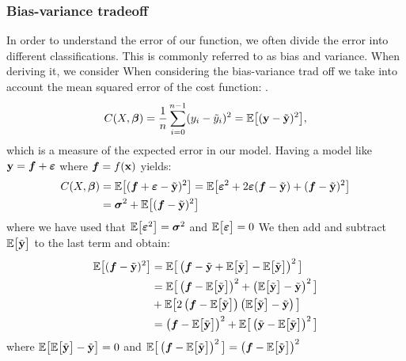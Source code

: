 \subsubsection{Bias-variance tradeoff}\label{sec:bias_variance_tradeoff}
In order to understand the error of our function, we often divide the error into different classifications. This is commonly referred to as bias and variance. When deriving it, we consider 
When considering the bias-variance trad off we take into account the mean squared error of the cost function: . 
\begin{align*}
    C(X, \boldsymbol{\beta}) = \frac{1}{n}\sum_{i=0}^{n-1}(y_i-\tilde{y}_i)^2 = \mathbb{E}\big[(\mathbf{y}-\tilde{\mathbf{y}})^2\big],
\end{align*}
which is a measure of the expected error in our model. Having a model like $\mathbf{y} = \boldsymbol{f} + \boldsymbol{\varepsilon}$ where $\boldsymbol{f} = f(\mathbf{x})$ yields:
\begin{align*}
    C(X, \boldsymbol{\beta})  &= \mathbb{E}\big[(\boldsymbol{f} + \boldsymbol{\varepsilon} - \tilde{\mathbf{y}})^2\big] = \mathbb{E}\big[\boldsymbol{\varepsilon}^2 + 2\boldsymbol{\varepsilon}(\boldsymbol{f}-\tilde{\mathbf{y}}) + (\boldsymbol{f}-\tilde{\mathbf{y}})^2\big] \\
    &= \boldsymbol{\sigma}^2 + \mathbb{E}\big[(\boldsymbol{f}-\tilde{\mathbf{y}})^2\big]
\end{align*}
where we have used that $\mathbb{E}\big[\boldsymbol{\varepsilon}^2\big] = \boldsymbol{\sigma}^2$ and $\mathbb{E}\big[\boldsymbol{\varepsilon}\big] = 0$ We then add and subtract $\mathbb{E}\big[\tilde{\mathbf{y}}\big]$ to the last term and obtain:
\begin{align*}
    \mathbb{E}\big[(\boldsymbol{f}-\tilde{\mathbf{y}})^2\big] &= \mathbb{E}\big[\left(\boldsymbol{f}-\tilde{\mathbf{y}}+\mathbb{E}\big[\tilde{\mathbf{y}}\big]-\mathbb{E}\big[\tilde{\mathbf{y}}\big]\right)^2\big] \\
    &= \mathbb{E}\big[\left(\boldsymbol{f}-\mathbb{E}\big[\tilde{\mathbf{y}}\big]\right)^2+ \left(\mathbb{E}\big[\tilde{\mathbf{y}}\big]-\tilde{\mathbf{y}}\right)^2\big] \\
    &+ \mathbb{E}\big[2\left(\boldsymbol{f}-\mathbb{E}\big[\tilde{\mathbf{y}}\big]\right)\left(\mathbb{E}\big[\tilde{\mathbf{y}}\big]-\tilde{\mathbf{y}}\right)\big] \\
    &=\left(\boldsymbol{f}-\mathbb{E}\big[\tilde{\mathbf{y}}\big]\right)^2+ \mathbb{E}\big[\left(\tilde{\mathbf{y}}-\mathbb{E}\big[\tilde{\mathbf{y}}\big]\right)^2\big]
\end{align*}
where $\mathbb{E}\big[\mathbb{E}\big[\tilde{\mathbf{y}}\big] - \tilde{\mathbf{y}}\big] = 0$ and $\mathbb{E}\big[\left(\boldsymbol{f}-\mathbb{E}\big[\tilde{\mathbf{y}}\big]\right)^2\big]=\left(\boldsymbol{f}-\mathbb{E}\big[\tilde{\mathbf{y}}\big]\right)^2$


